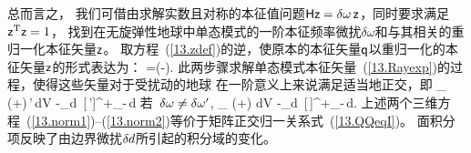 {{%

总而言之，
我们可借由求解实数且对称的本征值问题$\mbox{${\sf H}$}\mbox{${\sf z}$}=\delta\mbox{$\omega$}\,\mbox{${\sf z}$}$，同时要求满足$\mbox{${\sf z}$}^{\rm T}\mbox{${\sf z}$}=1$，
找到在无旋弹性地球中单态模式的一阶本征频率微扰$\delta\omega$和与其相关的重归一化本征矢量$\mbox{${\sf z}$}$。
取方程~(\ref{13.zdef})的逆，使原本的本征矢量$\mbox{${\sf q}$}$以重归一化的本征矢量$\mbox{${\sf z}$}$的形式表达为：
\eq \label{13.zrelq}
\ssq=(\ssI-\half\ssT)\ssz.
\en
此两步骤求解单态模式本征矢量~(\ref{13.Rayexp})的过程，使得这些矢量对于受扰动的地球
在一阶意义上来说满足适当地正交，即
\eq \label{13.norm1}
\int_{\subearth}
(\rho+\delta\hspace{-0.2 mm}\rho)\,\bs\cdot\bs'\,dV
-\int_{\Sigma}\delta\hspace{-0.1 mm}d
\,[\rho\,\bs\cdot\bs']^+_-\,d\/
\quad\mbox{若 $\delta\om\neq\delta\om'$,}
\en
\eq \label{13.norm2}
\int_{\subearth}
(\rho+\delta\hspace{-0.2 mm}\rho)\,\bs\cdot\bs\,dV
-\int_{\Sigma}\delta\hspace{-0.1 mm}d
\,[\rho\,\bs\cdot\bs]^+_-\,d\/.
\en
上述两个三维方程~(\ref{13.norm1})--(\ref{13.norm2})等价于矩阵正交归一关系式~(\ref{13.QQeqI})。
面积分项反映了由边界微扰$\delta\hspace{-0.1 mm}d$所引起的积分域的变化。
%
%

\renewcommand{\thesubsection}{$\!\!\!\raise1.3ex\hbox{$\star$}\!\!$
\arabic{chapter}.\arabic{section}.\arabic{subsection}}
}}
